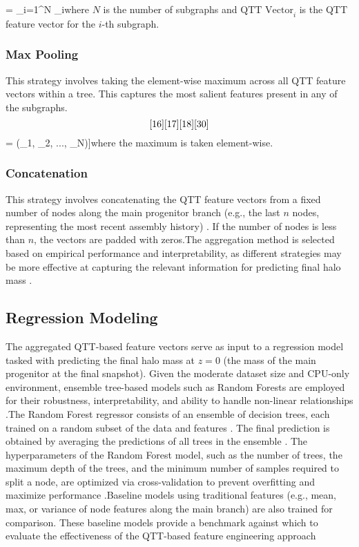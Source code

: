 \documentclass[twocolumn]{aastex631}
\begin{document}
\[\] =  \sum_{i=1}^{N} _i\]where \(N\) is the number of subgraphs and \(\text{QTT Vector}_i\) is the QTT feature vector for the \(i\)-th subgraph.\subsubsection{Max Pooling}This strategy involves taking the element-wise maximum across all QTT feature vectors within a tree. This captures the most salient features present in any of the subgraphs.\[
\cite{16}\cite{17}\cite{18}\cite{30}
\] = \max(_1, _2, ..., _N)]where the maximum is taken element-wise.\subsubsection{Concatenation}This strategy involves concatenating the QTT feature vectors from a fixed number of nodes along the main progenitor branch (e.g., the last \(n\) nodes, representing the most recent assembly history)  \citep{ye2024quantizedtensornetworkssolving,ye2024quantizedtensornetworkssolving}. If the number of nodes is less than \(n\), the vectors are padded with zeros.The aggregation method is selected based on empirical performance and interpretability, as different strategies may be more effective at capturing the relevant information for predicting final halo mass  \citep{larson2024predictingdarkmatterhalo,cui2024knowhalomassfunction}.\subsection{Regression Modeling}The aggregated QTT-based feature vectors serve as input to a regression model tasked with predicting the final halo mass at \(z=0\) (the mass of the main progenitor at the final snapshot). Given the moderate dataset size and CPU-only environment, ensemble tree-based models such as Random Forests are employed for their robustness, interpretability, and ability to handle non-linear relationships  \citep{larson2024predictingdarkmatterhalo}.The Random Forest regressor consists of an ensemble of decision trees, each trained on a random subset of the data and features  \citep{reis2018probabilisticrandomforestmachine}. The final prediction is obtained by averaging the predictions of all trees in the ensemble  \citep{reis2018probabilisticrandomforestmachine}. The hyperparameters of the Random Forest model, such as the number of trees, the maximum depth of the trees, and the minimum number of samples required to split a node, are optimized via cross-validation to prevent overfitting and maximize performance  \citep{reis2018probabilisticrandomforestmachine}.Baseline models using traditional features (e.g., mean, max, or variance of node features along the main branch) are also trained for comparison. These baseline models provide a benchmark against which to evaluate the effectiveness of the QTT-based feature engineering approach  \]
\end{document}
